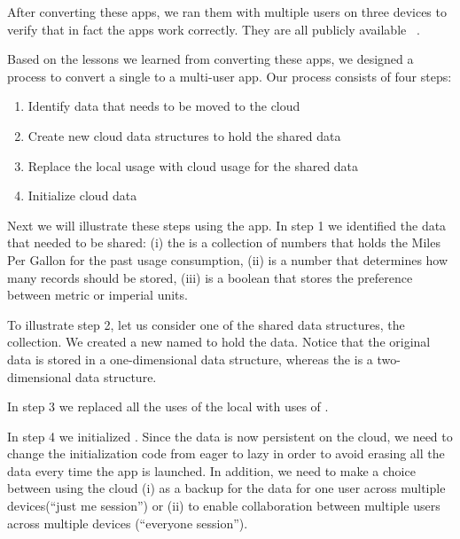 \documentclass[preprint]{sigplanconf}
\begin{document}
After converting these apps, we ran them with multiple users on three devices to verify that in fact the apps work correctly. They are all publicly available~\cite{MileageTrackerFinal,BusinessManagerFinal,CliffHangersFinal,MyAssignmentsFinal} .

Based on the lessons we learned from converting these \numFormative apps, we designed a process to convert  a single to a multi-user app.  Our process consists of four steps:   
\begin{enumerate}
\item Identify data that needs to be moved to the cloud

\item Create new cloud data structures to hold the shared data

\item Replace the local usage with cloud usage for the shared data

\item Initialize cloud data
\end{enumerate}

Next we will illustrate these steps using the \MT app.  In step 1 we identified the data that needed to be shared: 
(i) the  is a collection of numbers that holds the Miles Per Gallon for the past usage consumption, 
(ii)  is a number that determines how many records should be stored, 
(iii)  is a boolean that stores the preference between metric or imperial units.
   
To illustrate step 2, let us consider one of the shared data structures, the  collection. 
We created a new  named  to hold the data. Notice that the
original data is stored in a one-dimensional data structure, whereas the  is a two-dimensional data 
structure.

In step 3 we replaced all the uses of the local  with uses of . 

In step 4 we initialized  . 
Since the data is now persistent on the cloud, we need to change the initialization code from 
eager to lazy in order to avoid erasing all the data every time the app is launched.  
In addition, we need to make a choice between using the cloud (i) as a backup for the data for one user across multiple devices(``just me session'') or (ii) to enable collaboration between multiple users across multiple devices (``everyone session'').
\end{document}
